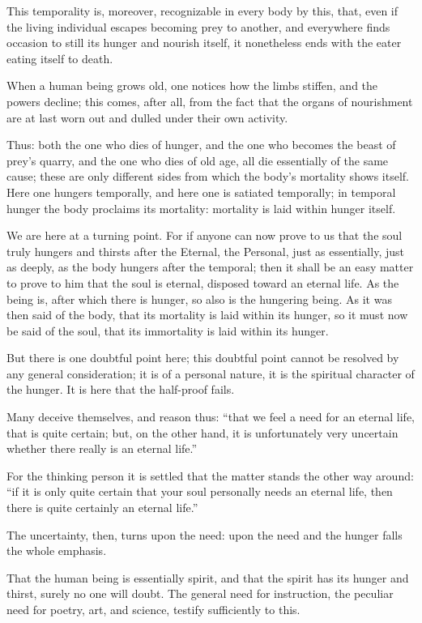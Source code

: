 \documentclass[12pt,a4paper]{book}
\begin{document}
This temporality is, moreover, recognizable in every body by this, that, even if the living individual escapes becoming prey to another, and everywhere finds occasion to still its hunger and nourish itself, it nonetheless ends with the eater eating itself to death.

When a human being grows old, one notices how the limbs stiffen, and the powers decline; this comes, after all, from the fact that the organs of nourishment are at last worn out and dulled under their own activity.

Thus: both the one who dies of hunger, and the one who becomes the beast of prey's quarry, and the one who dies of old age,
all die essentially of the same cause; these are only different sides from which the body's mortality shows itself. Here one hungers temporally, and here one is satiated temporally; in temporal hunger the body proclaims its mortality: mortality is laid within hunger itself.

We are here at a turning point. For if anyone can now prove to us that the soul truly hungers and thirsts after the Eternal, the Personal, just as essentially, just as deeply, as the body hungers after the temporal; then it shall be an easy matter to prove to him that the soul is eternal, disposed toward an eternal life. As the being is, after which there is hunger, so also is the hungering being. As it was then said of the body, that its mortality is laid within its hunger, so it must now be said of the soul, that its immortality is laid within its hunger.

But there is one doubtful point here; this doubtful point cannot be resolved by any general consideration; it is of a personal nature, it is the spiritual character of the hunger. It is here that the half-proof fails.

Many deceive themselves, and reason thus: ``that we feel a need for an eternal life, that is quite certain; but, on the other hand, it is unfortunately very uncertain whether there really is an eternal life.''

For the thinking person it is settled that the matter stands the other way around: ``if it is only quite certain that your soul personally needs an eternal life, then there is quite certainly an eternal life.''

The uncertainty, then, turns upon the need: upon the need and the hunger falls the whole emphasis.

That the human being is essentially spirit, and that the spirit has its hunger and thirst, surely no one will doubt. The general need for instruction, the peculiar need for poetry, art, and science, testify sufficiently to this.
\end{document}
